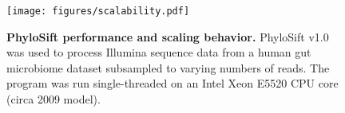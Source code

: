 \documentclass[10pt]{article}
\begin{document}
\begin{figure}[hp]
\begin{center}
\texttt{[image: figures/scalability.pdf]}
\end{center}
\caption{\textbf{PhyloSift performance and scaling behavior.} PhyloSift v1.0 was used to process Illumina sequence data from a human gut microbiome dataset subsampled to varying numbers of reads. The program was run single-threaded on an Intel Xeon E5520 CPU core (circa 2009 model).}
\label{fig:scalability}
\end{figure}

\clearpage
\end{document}
